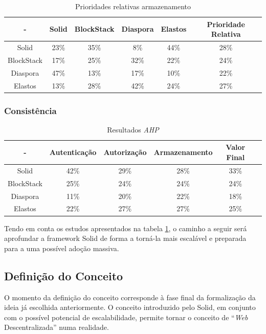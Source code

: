 \begin{table}[H]
\centering
\caption{Prioridades relativas armazenamento}
\vspace{0.5cm}
\begin{tabular}{c|c|c|c|c|c} 
 - & Solid & BlockStack & Diaspora & Elastos & Prioridade Relativa \\
\hline                               
Solid & 23\% & 35\% & 8\% & 44\% & 28\% \\
BlockStack &  17\% & 25\%	& 32\%	& 22\%	& 24\% \\
Diaspora &  47\% &	13\% & 17\%	& 10\% & 22\% \\
Elastos & 13\% & 28\% & 42\% & 24\% & 27\% \\
\end{tabular}
\end{table}

\subsubsection{Consistência}

\begin{table}[h]
\centering
\caption{Resultados \emph{\acrshort{AHP}}}
\label{tabela_resultados_ahp}
\vspace{0.5cm}
\begin{tabular}{c|c|c|c|c|c} 
 - & Autenticação & Autorização & Armazenamento & Valor Final & \\
\hline                               
Solid & 42\% &	29\% & 28\%	& 33\% & \\
BlockStack &  25\% & 24\% & 24\% & 24\% & \\
Diaspora &  11\% &	20\% & 22\% & 18\% & \\
Elastos & 22\% & 27\% & 27\% & 25\% & \\
\end{tabular}
\end{table}

Tendo em conta os estudos apresentados na tabela \ref{tabela_resultados_ahp}, o caminho a seguir será aprofundar a framework Solid de forma a torná-la mais escalável e preparada para a uma possível adoção massiva.

\subsection{Definição do Conceito}
O momento da definição do conceito corresponde à fase final da formalização da ideia já escolhida anteriormente. O conceito introduzido pelo Solid, em conjunto com o possível potencial de escalabilidade, permite tornar o conceito de “\emph{Web} Descentralizada” numa realidade.

